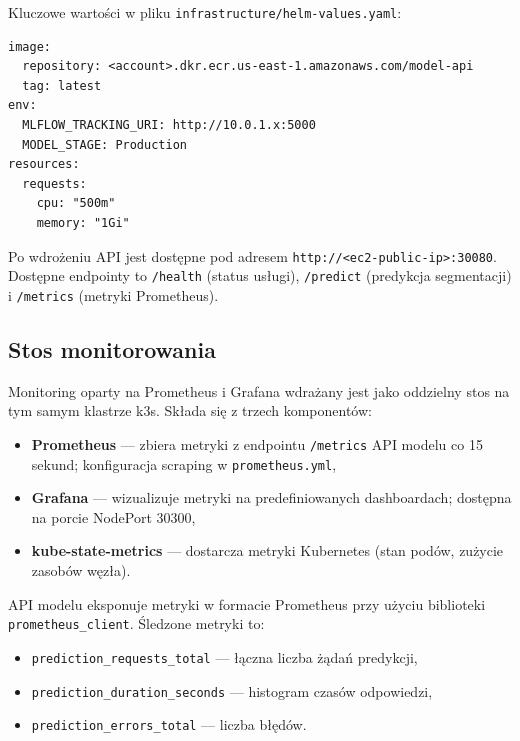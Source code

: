 Kluczowe wartości w pliku \texttt{infrastructure/helm-values.yaml}:
\begin{verbatim}
image:
  repository: <account>.dkr.ecr.us-east-1.amazonaws.com/model-api
  tag: latest
env:
  MLFLOW_TRACKING_URI: http://10.0.1.x:5000
  MODEL_STAGE: Production
resources:
  requests:
    cpu: "500m"
    memory: "1Gi"
\end{verbatim}

Po wdrożeniu API jest dostępne pod adresem \texttt{http://<ec2-public-ip>:30080}. Dostępne endpointy to \texttt{/health} (status usługi), \texttt{/predict} (predykcja segmentacji) i \texttt{/metrics} (metryki Prometheus).

\subsection{Stos monitorowania}

Monitoring oparty na Prometheus \cite{prometheus_docs} i Grafana wdrażany jest jako oddzielny stos na tym samym klastrze k3s. Składa się z trzech komponentów:

\begin{itemize}
  \item \textbf{Prometheus} --- zbiera metryki z endpointu \texttt{/metrics} API modelu co 15 sekund; konfiguracja scraping w \texttt{prometheus.yml},
  \item \textbf{Grafana} --- wizualizuje metryki na predefiniowanych dashboardach; dostępna na porcie NodePort 30300,
  \item \textbf{kube-state-metrics} --- dostarcza metryki Kubernetes (stan podów, zużycie zasobów węzła).
\end{itemize}

\begin{sloppypar}
API modelu eksponuje metryki w formacie Prometheus przy użyciu biblioteki \texttt{prometheus\_client}. Śledzone metryki to:
\end{sloppypar}
\begin{itemize}
  \item \texttt{prediction\_requests\_total} --- łączna liczba żądań predykcji,
  \item \texttt{prediction\_duration\_seconds} --- histogram czasów odpowiedzi,
  \item \texttt{prediction\_errors\_total} --- liczba błędów.
\end{itemize}


